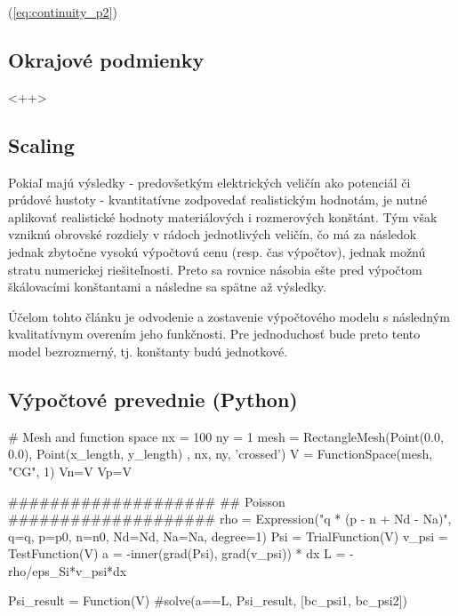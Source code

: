 \documentclass{eeict}
\begin{document}
(\ref{eq:continuity_p2})
 
\subsection{Okrajové podmienky}<++>
\subsection{Scaling}
Pokiaľ majú výsledky - predovšetkým elektrických veličín ako potenciál či prúdové hustoty - kvantitatívne zodpovedať realistickým hodnotám, je nutné aplikovať realistické hodnoty materiálových i rozmerových konštánt. Tým však vzniknú obrovské rozdiely v rádoch jednotlivých veličín, čo má za následok jednak zbytočne vysokú výpočtovú cenu (resp. čas výpočtov), jednak možnú stratu numerickej riešiteľnosti. Preto sa rovnice násobia ešte pred výpočtom škálovacími konštantami \cite{selberherr} \cite{de_mari} a následne sa spätne  až výsledky.

Účelom tohto článku je odvodenie a zostavenie výpočtového modelu s následným kvalitatívnym overením jeho funkčnosti. Pre jednoduchosť bude preto tento model bezrozmerný, tj. konštanty budú jednotkové.
\subsection{Výpočtové prevednie (Python)}


\begin{mycode1}
# Mesh and function space
nx = 100
ny = 1
mesh = RectangleMesh(Point(0.0, 0.0), Point(x_length, y_length) , nx, ny, 'crossed')
V = FunctionSpace(mesh, "CG", 1)
Vn=V
Vp=V
\end{mycode1}

\begin{mycode1}
####################
## Poisson
####################
rho = Expression("q * (p - n + Nd - Na)", q=q, p=p0, n=n0, Nd=Nd, Na=Na, degree=1)
Psi = TrialFunction(V)
v_psi = TestFunction(V)
a = -inner(grad(Psi), grad(v_psi)) * dx
L = -rho/eps_Si*v_psi*dx

Psi_result = Function(V)
#solve(a==L, Psi_result, [bc_psi1, bc_psi2])
\end{mycode1}
\end{document}
